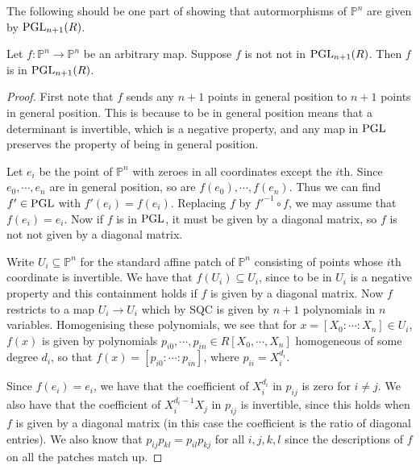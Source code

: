 The following should be one part of showing that autormorphisms of $\mathbb P^n$ are
given by $\operatorname{PGL}_{n+1}(R)$.

\begin{theorem}
Let $f : \mathbb P^n \to \mathbb P^n$ be an arbitrary map.
Suppose $f$ is not not in $\operatorname{PGL}_{n+1}(R)$. Then $f$ is in $\operatorname{PGL}_{n+1}(R)$.
\end{theorem}
\begin{proof}
First note that $f$ sends any $n+1$ points in general position to $n+1$ points in general position.
This is because to be in general position means that a determinant is invertible, which
is a negative property, and any map in $\operatorname{PGL}$ preserves the property of being in general position.

Let $e_i$ be the point of $\mathbb P^n$ with zeroes in all coordinates except the $i$th.
Since $e_0, \cdots, e_n$ are in general position, so are $f(e_0), \cdots, f(e_n)$.
Thus we can find $f' \in \operatorname{PGL}$ with $f'(e_i) = f(e_i)$. Replacing $f$ by $f'^{-1} \circ f$,
we may assume that $f(e_i) = e_i$. Now if $f$ is in $\operatorname{PGL}$, it must be given by a diagonal matrix,
so $f$ is not not given by a diagonal matrix.

Write $U_i \subseteq \mathbb P^n$ for the standard affine patch of $\mathbb P^n$
consisting of points whose $i$th coordinate is invertible. 
We have that $f(U_i) \subseteq U_i$, since to be in $U_i$ is a negative property
and this containment holds if $f$ is given by a diagonal matrix.
Now $f$ restricts to a map $U_i \to U_i$ which by SQC is given by $n+1$
polynomials in $n$ variables. Homogenising these polynomials,
we see that for $x = [X_0 : \cdots : X_n] \in U_i$,
$f(x)$ is given by polynomials
$p_{i0},\cdots,p_{in} \in R[X_0, \cdots, X_n]$ homogeneous of some degree $d_i$,
so that $f(x) = [p_{i0} : \cdots : p_{in}]$,
where $p_{ii} = X_i^{d_i}$.

Since $f(e_i) = e_i$, we have that the coefficient of $X_i^{d_i}$ in $p_{ij}$ is
zero for $i \ne j$. We also have that the coefficient of $X_i^{d_i-1} X_j$ in $p_{ij}$
is invertible, since this holds when $f$ is given by a diagonal matrix 
(in this case the coefficient is the ratio of diagonal entries).
We also know that $p_{ij}p_{kl} = p_{il}p_{kj}$ for all $i, j, k, l$ since
the descriptions of $f$ on all the patches match up.


\end{proof}
